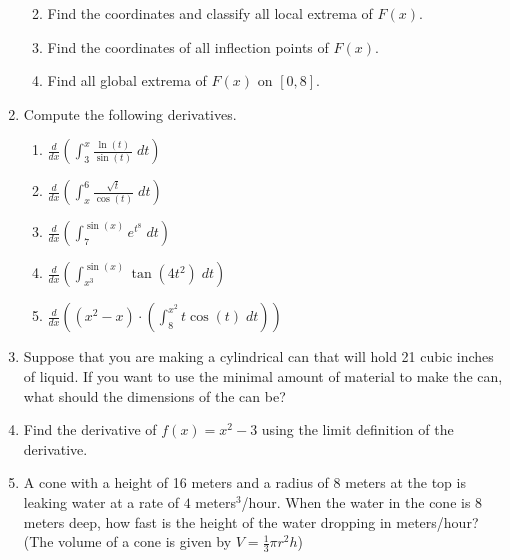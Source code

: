 \documentclass[11pt]{article}
\newcommand{\ds}{\displaystyle}
\begin{document}
\begin{enumerate}
\begin{enumerate}
    \newpage
    
  \item Find the coordinates and classify all local extrema of $F(x)$.
    \vfill
  \item Find the coordinates of all inflection points of $F(x)$.
    \vfill
  \item Find all global extrema of $F(x)$ on $[0,8]$.
    \vfill
  \end{enumerate}
  
  \newpage
  
\item Compute the following derivatives.
  \begin{enumerate}
  \item $\ds\frac{d}{dx}\left(\int_3^x \frac{\ln(t)}{\sin(t)}\;dt\right)$ \vfill
  \item $\ds\frac{d}{dx}\left(\int_x^6 \frac{\sqrt{t}}{\cos(t)}\;dt\right)$ \vfill
  \item $\ds\frac{d}{dx}\left(\int_7^{\sin(x)} e^{t^8}\;dt\right)$ \vfill
    \newpage
  \item $\ds\frac{d}{dx}\left(\int_{x^{3}}^{\sin(x)} \tan(4t^2)\;dt\right)$ \vfill
  \item $\ds\frac{d}{dx}\left(\left(x^2-x\right) \cdot
      \left(\int_{8}^{x^2} t\cos(t)\;dt\right)\right)$ \vfill
  \end{enumerate}
  
  \newpage
  
\item Suppose that you are making a cylindrical can that will hold 21
  cubic inches of liquid.  If you want to use the minimal amount of
  material to make the can, what should the dimensions of the can be?
  \vfill 
  
\item Find the derivative of $f(x)=x^2-3$ using the limit definition
  of the derivative.
  \vfill
  
  \newpage
  
\item A cone with a height of 16 meters and a radius of 8 meters at
  the top is leaking water at a rate of $4$ meters$^3$/hour.  When
  the water in the cone is 8 meters deep, how fast is the height of
  the water dropping in meters/hour? (The volume of a cone is given by
  $V=\frac{1}{3}\pi r^2 h$)
  
  \newpage
  

\end{enumerate}
\end{document}
